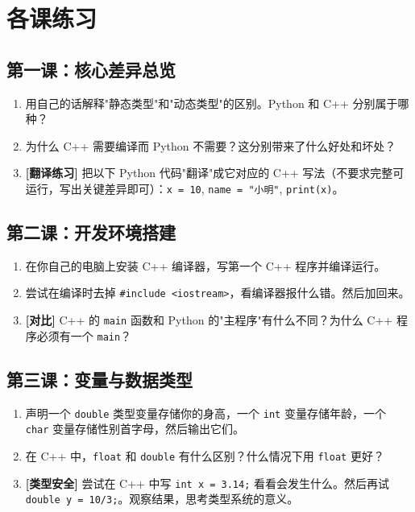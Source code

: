 \documentclass[a4paper,12pt]{ctexart}
\begin{document}
\section*{各课练习}

\subsection*{第一课：核心差异总览}
\begin{enumerate}
  \item 用自己的话解释"静态类型"和"动态类型"的区别。Python 和 C++ 分别属于哪种？
  \item 为什么 C++ 需要编译而 Python 不需要？这分别带来了什么好处和坏处？
  \item \textbf{[翻译练习]} 把以下 Python 代码"翻译"成它对应的 C++ 写法（不要求完整可运行，写出关键差异即可）：\texttt{x = 10}, \texttt{name = "小明"}, \texttt{print(x)}。
\end{enumerate}

\subsection*{第二课：开发环境搭建}
\begin{enumerate}
  \item 在你自己的电脑上安装 C++ 编译器，写第一个 C++ 程序并编译运行。
  \item 尝试在编译时去掉 \texttt{\#include <iostream>}，看编译器报什么错。然后加回来。
  \item \textbf{[对比]} C++ 的 \texttt{main} 函数和 Python 的"主程序"有什么不同？为什么 C++ 程序必须有一个 \texttt{main}？
\end{enumerate}

\subsection*{第三课：变量与数据类型}
\begin{enumerate}
  \item 声明一个 \texttt{double} 类型变量存储你的身高，一个 \texttt{int} 变量存储年龄，一个 \texttt{char} 变量存储性别首字母，然后输出它们。
  \item 在 C++ 中，\texttt{float} 和 \texttt{double} 有什么区别？什么情况下用 \texttt{float} 更好？
  \item \textbf{[类型安全]} 尝试在 C++ 中写 \texttt{int x = 3.14;} 看看会发生什么。然后再试 \texttt{double y = 10/3;}。观察结果，思考类型系统的意义。
\end{enumerate}
\end{document}
